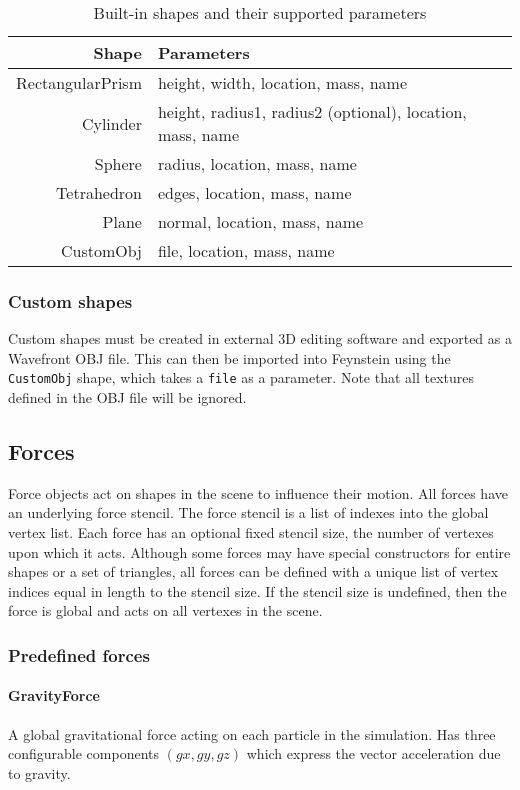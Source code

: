 \documentclass[letterpaper]{article}
\newcommand\subsubsubsection[1]{\paragraph{#1}}
\begin{document}
\begin{table}\centering
  \begin{tabular}{r|l}
    Shape & Parameters \\ \hline
    RectangularPrism & height, width, location, mass, name \\
    Cylinder & height, radius1, radius2 (optional), location, mass, name \\
    Sphere & radius, location, mass, name \\
    Tetrahedron & edges, location, mass, name \\
    Plane & normal, location, mass, name \\
    CustomObj & file, location, mass, name \\
  \end{tabular} 
\caption{Built-in shapes and their supported parameters}
\label{tab:shapes}
\end{table}

\subsubsection{Custom shapes}
Custom shapes must be created in external 3D editing software and
exported as a Wavefront OBJ file. This can then be imported into
Feynstein using the \texttt{CustomObj} shape, which takes a \texttt{file} as a
parameter. Note that all textures defined in the OBJ file will be
ignored.

\subsection{Forces}
Force objects act on shapes in the scene to influence their
motion. All forces have an underlying force stencil. The force stencil
is a list of indexes into the global vertex list. Each force has an
optional fixed stencil size, the number of vertexes upon which it
acts. Although some forces may have special constructors for entire
shapes or a set of triangles, all forces can be defined with a unique
list of vertex indices equal in length to the stencil size. If the
stencil size is undefined, then the force is global and acts on all
vertexes in the scene.

\subsubsection{Predefined forces}
\subsubsubsection{GravityForce}

A global gravitational force acting on each particle in the
simulation. Has three configurable components $(gx, gy, gz)$ which
express the vector acceleration due to gravity.
\end{document}
